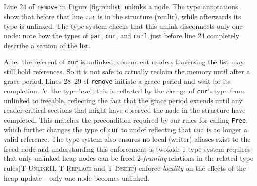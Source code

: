Line 24 of \lstinline|remove| in Figure \ref{fig:rculist} unlinks a node.
The type annotations show that before that line \lstinline|cur| is in the structure (\textsf{rcuItr}), while afterwards its type is \textsf{unlinked}.
The type system checks that this unlink disconnects only one node: note how the types of \lstinline|par|, \lstinline|cur|, and \lstinline|curl| just before line 24 completely describe a section of the list.

After the referent of \texttt{cur} is unlinked, concurrent readers traversing the list may still hold references.  So it is not safe to actually reclaim the memory until after a grace period.
Lines 28--29 of \lstinline|remove| initiate a grace period and wait for its completion.  At the type level, this is reflected by the change of \lstinline|cur|'s type from \textsf{unlinked} to \textsf{freeable}, reflecting the fact that the grace period extends until any reader critical sections that might have observed the node in the structure have completed.
This matches the precondition required by our rules for calling \lstinline|Free|, which further changes the type of \lstinline|cur| to \textsf{undef} reflecting that \lstinline|cur| is no longer a valid reference. The type system also ensures no local (writer) aliases exist to the freed node and understanding this enforcement is twofold: 1-type system requires that only \textsf{unlinked} heap nodes can be freed 2-\textit{framing} relations in the related type rules(\textsc{T-UnlinkH}, \textsc{T-Replace} and \textsc{T-Insert}) enforce \textit{locality} on the effects of the heap update -- only one node becomes \textsf{unlinked}.

